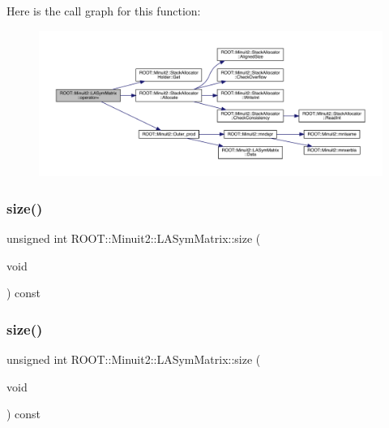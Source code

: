 Here is the call graph for this function\+:\nopagebreak
\begin{figure}[H]
\begin{center}
\leavevmode
\includegraphics[width=350pt]{d3/d72/classROOT_1_1Minuit2_1_1LASymMatrix_a6d385d24fe98b336532837ad39f5c615_cgraph}
\end{center}
\end{figure}
\mbox{\label{classROOT_1_1Minuit2_1_1LASymMatrix_af924c1e0eb1578716a8cb8940cc08563}} 
\subsubsection{\texorpdfstring{size()}{size()}\hspace{0.1cm}{\footnotesize\ttfamily [1/2]}}
{\footnotesize\ttfamily unsigned int R\+O\+O\+T\+::\+Minuit2\+::\+L\+A\+Sym\+Matrix\+::size (\begin{DoxyParamCaption}\item[{void}]{ }\end{DoxyParamCaption}) const\hspace{0.3cm}{\ttfamily [inline]}}

\mbox{\label{classROOT_1_1Minuit2_1_1LASymMatrix_af924c1e0eb1578716a8cb8940cc08563}} 
\subsubsection{\texorpdfstring{size()}{size()}\hspace{0.1cm}{\footnotesize\ttfamily [2/2]}}
{\footnotesize\ttfamily unsigned int R\+O\+O\+T\+::\+Minuit2\+::\+L\+A\+Sym\+Matrix\+::size (\begin{DoxyParamCaption}\item[{void}]{ }\end{DoxyParamCaption}) const\hspace{0.3cm}{\ttfamily [inline]}}

